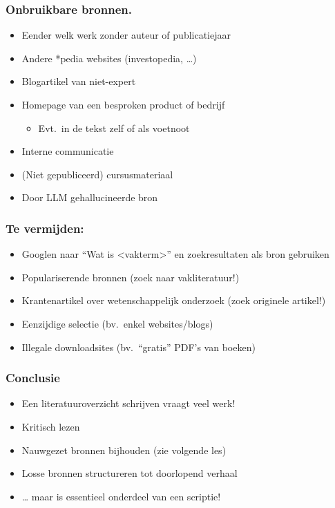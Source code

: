 \documentclass[aspectratio=169]{beamer}
\begin{document}
\begin{frame}
  \frametitle{Onbruikbare bronnen.}

  \begin{itemize}
    \item Eender welk werk zonder auteur of publicatiejaar
    \item Andere *pedia websites (investopedia, \dots)
    \item Blogartikel van niet-expert
    \item Homepage van een besproken product of bedrijf
          \begin{itemize}
            \item Evt.~in de tekst zelf of als voetnoot
          \end{itemize}
    \item Interne communicatie
    \item (Niet gepubliceerd) cursusmateriaal
    \item Door LLM gehallucineerde bron
  \end{itemize}
\bigskip
\end{frame}

\begin{frame}
  \frametitle{Te vermijden:}

  \begin{itemize}
    \item Googlen naar ``Wat is <vakterm>'' en zoekresultaten als bron gebruiken
    \item Populariserende bronnen (zoek naar vakliteratuur!)
    \item Krantenartikel over wetenschappelijk onderzoek (zoek originele artikel!)
    \item Eenzijdige selectie (bv.~enkel websites/blogs)
    \item Illegale downloadsites (bv.~``gratis'' PDF's van boeken)
  \end{itemize}
\end{frame}

\begin{frame}
  \frametitle{Conclusie}

  \begin{itemize}
    \item Een literatuuroverzicht schrijven vraagt veel werk!
    \item Kritisch lezen
    \item Nauwgezet bronnen bijhouden (zie volgende les)
    \item Losse bronnen structureren tot doorlopend verhaal
    \item \ldots{} maar is essentieel onderdeel van een scriptie!
  \end{itemize}

\end{frame}
\end{document}
